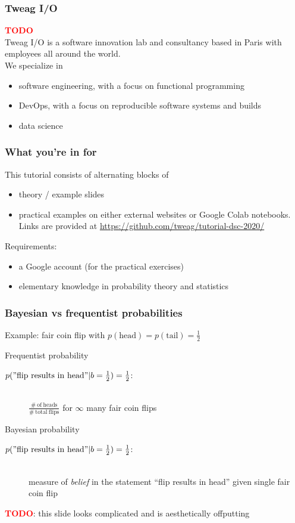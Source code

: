 \documentclass[t, aspectratio=169]{beamer}
\newcommand{\todo}{\textcolor{red}{\textbf{TODO}}}
\begin{document}
\begin{frame}
  \frametitle{Tweag I/O}
  \todo \\
  Tweag I/O is a software innovation lab and consultancy based in Paris with employees all around the world.\\
  We specialize in
  \begin{itemize}
  \item software engineering, with a focus on functional programming
  \item DevOps, with a focus on reproducible software systems and builds
  \item data science
  \end{itemize}
\end{frame}


\begin{frame}
  \frametitle{What you're in for}
  This tutorial consists of alternating blocks of
  \begin{itemize}
  \item theory / example slides
  \item practical examples on either external websites or Google Colab notebooks. Links are provided at {\centering \url{https://github.com/tweag/tutorial-dsc-2020/}}
  \end{itemize}

  Requirements:
  \begin{itemize}
  \item a Google account (for the practical exercises)
  \item elementary knowledge in probability theory and statistics
  \end{itemize}
\end{frame}


\begin{frame}
  \frametitle{Bayesian vs frequentist probabilities}
  Example: fair coin flip with $p(\mathrm{head}) = p(\mathrm{tail}) = \frac{1}{2}$
  \begin{block}{Frequentist probability}
    \begin{description}
    \item[$p(\mathrm{"flip\ results\ in\ head"}|b=\frac{1}{2})=\frac{1}{2}$:] \hfill \\ $\frac{\mathrm{\# \ of \ heads}}{\mathrm{\# \ total \ flips}}$ for $\infty$ many fair coin flips
    \end{description}
  \end{block}
  \begin{block}{Bayesian probability}
    \begin{description}
    \item[$p(\mathrm{"flip\ results\ in\ head"}|b=\frac{1}{2})=\frac{1}{2}$:] \hfill \\ measure of \textit{belief} in the statement ``flip results in head'' given single fair coin flip
    \end{description}
  \end{block}
  \todo: this slide looks complicated and is aesthetically offputting
\end{frame}
\end{document}
